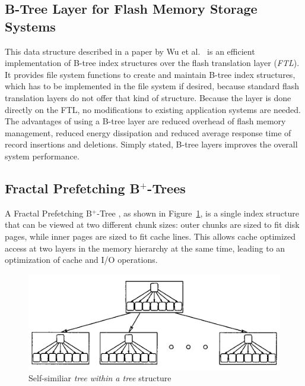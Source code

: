 \documentclass{acm_proc_article-sp}
\begin{document}
\subsection{B-Tree Layer for Flash Memory Storage Systems}
This data structure described in a paper by Wu et al.~\cite{wu2007efficient} is an efficient implementation of B-tree index structures over the flash translation layer (\emph{FTL}). It provides file system functions to create and maintain B-tree index structures, which has to be implemented in the file system if desired, because standard flash translation layers do not offer that kind of structure. Because the layer is done directly on the FTL, no modifications to existing application systems are needed. The advantages of using a B-tree layer are reduced overhead of flash memory management, reduced energy dissipation and reduced average response time of record insertions and deletions. Simply stated, B-tree layers improves the overall system performance.

\subsection{Fractal Prefetching B$^{+}$-Trees}
A Fractal Prefetching B$^{+}$-Tree \cite{chen2002fractal}, as shown in Figure~\ref{fig:b-tree}, is a single index structure that can be viewed at two different chunk sizes: outer chunks are sized to fit disk pages, while inner pages are sized to fit cache lines. This allows cache optimized access at two layers in the memory hierarchy at the same time, leading to an optimization of cache and I/O operations.

\begin{figure}[ht]
\centering
\includegraphics[width=\columnwidth]{b-tree.png}
\caption{Self-similiar \emph{tree within a tree} structure \cite{chen2002fractal}}
\label{fig:b-tree}
\end{figure}
\end{document}
